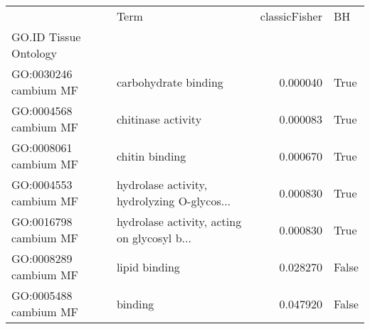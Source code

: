 \begin{tabular}{llrl}
\toprule
{} &                                         Term &  classicFisher &     BH \\
GO.ID      Tissue  Ontology &                                              &                &        \\
GO:0030246 cambium MF       &  carbohydrate binding &  0.000040 &  True \\
\midrule
GO:0004568 cambium MF       &  chitinase activity &  0.000083 &  True \\
GO:0008061 cambium MF       &  chitin binding &  0.000670 &  True \\
GO:0004553 cambium MF       &  hydrolase activity, hydrolyzing O-glycos... &  0.000830 &  True \\
GO:0016798 cambium MF       &  hydrolase activity, acting on glycosyl b... &  0.000830 &  True \\
GO:0008289 cambium MF       &  lipid binding &  0.028270 &  False \\
GO:0005488 cambium MF       &  binding &  0.047920 &  False \\
\bottomrule
\end{tabular}
